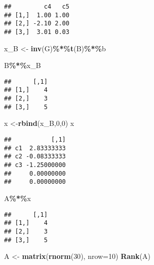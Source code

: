 \documentclass[
]{article}
\newenvironment{Shaded}{\begin{snugshade}}{\end{snugshade}}
\newcommand{\AttributeTok}[1]{\textcolor[rgb]{0.13,0.29,0.53}{#1}}
\newcommand{\DecValTok}[1]{\textcolor[rgb]{0.00,0.00,0.81}{#1}}
\newcommand{\FunctionTok}[1]{\textcolor[rgb]{0.13,0.29,0.53}{\textbf{#1}}}
\newcommand{\NormalTok}[1]{#1}
\newcommand{\OtherTok}[1]{\textcolor[rgb]{0.56,0.35,0.01}{#1}}
\newcommand{\SpecialCharTok}[1]{\textcolor[rgb]{0.81,0.36,0.00}{\textbf{#1}}}
\begin{document}
\begin{verbatim}
##         c4   c5
## [1,]  1.00 1.00
## [2,] -2.10 2.00
## [3,]  3.01 0.03
\end{verbatim}

\begin{Shaded}
\begin{Highlighting}[]
\NormalTok{x\_B }\OtherTok{\textless{}{-}} \FunctionTok{inv}\NormalTok{(G)}\SpecialCharTok{\%*\%}\FunctionTok{t}\NormalTok{(B)}\SpecialCharTok{\%*\%}\NormalTok{b}

\NormalTok{B}\SpecialCharTok{\%*\%}\NormalTok{x\_B}
\end{Highlighting}
\end{Shaded}

\begin{verbatim}
##      [,1]
## [1,]    4
## [2,]    3
## [3,]    5
\end{verbatim}

\begin{Shaded}
\begin{Highlighting}[]
\NormalTok{x }\OtherTok{\textless{}{-}}\FunctionTok{rbind}\NormalTok{(x\_B,}\DecValTok{0}\NormalTok{,}\DecValTok{0}\NormalTok{)}
\NormalTok{x}
\end{Highlighting}
\end{Shaded}

\begin{verbatim}
##           [,1]
## c1  2.83333333
## c2 -0.08333333
## c3 -1.25000000
##     0.00000000
##     0.00000000
\end{verbatim}

\begin{Shaded}
\begin{Highlighting}[]
\NormalTok{A}\SpecialCharTok{\%*\%}\NormalTok{x}
\end{Highlighting}
\end{Shaded}

\begin{verbatim}
##      [,1]
## [1,]    4
## [2,]    3
## [3,]    5
\end{verbatim}

\begin{Shaded}
\begin{Highlighting}[]
\NormalTok{A }\OtherTok{\textless{}{-}} \FunctionTok{matrix}\NormalTok{(}\FunctionTok{rnorm}\NormalTok{(}\DecValTok{30}\NormalTok{), }\AttributeTok{nrow=}\DecValTok{10}\NormalTok{)}
\FunctionTok{Rank}\NormalTok{(A)}
\end{Highlighting}
\end{Shaded}
\end{document}
